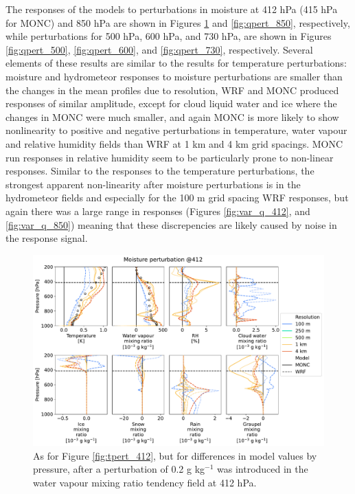 \documentclass[draft]{agujournal2019}
\begin{document}
The responses of the models to perturbations in moisture at 412 hPa (415 hPa for
MONC) and 850 hPa are shown in Figures \ref{fig:qpert_412} and
\ref{fig:qpert_850}, respectively, while perturbations for 500 hPa, 600 hPa, and
730 hPa, are shown in Figures \ref{fig:qpert_500}, \ref{fig:qpert_600}, and
\ref{fig:qpert_730}, respectively. Several elements of these results are similar
to the results for temperature perturbations: moisture and hydrometeor responses
to moisture perturbations are smaller than the changes in the mean profiles due
to resolution, WRF and MONC produced responses of similar amplitude, except for
cloud liquid water and ice where the changes in MONC were much smaller, and
again MONC is more likely to show nonlinearity to positive and negative
perturbations in temperature, water vapour and relative humidity fields than WRF
at 1 km and 4 km grid spacings. MONC run responses in relative humidity seem to
be particularly prone to non-linear responses. Similar to the responses to the
temperature perturbations, the strongest apparent non-linearity after moisture
perturbations is in the hydrometeor fields and especially for the 100 m grid
spacing WRF responses, but again there was a large range in responses (Figures
\ref{fig:var_q_412}, and \ref{fig:var_q_850}) meaning that these discrepencies
are likely caused by noise in the response signal.

\begin{figure}[pth]
    \noindent\includegraphics[width=\textwidth]{figures/pert_diffs_q_0.0002_@412}
    \caption{As for Figure \ref{fig:tpert_412}, but for differences in model
    values by pressure, after a perturbation of 0.2 g kg$^{-1}$ was introduced
    in the water vapour mixing ratio tendency field at 412 hPa.}
    \label{fig:qpert_412}
\end{figure}
\end{document}
